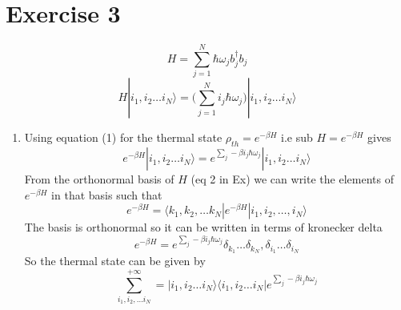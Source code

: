 \documentclass[12pt]{article}
\begin{document}
\section{Exercise 3}
$$ H = \sum_{j=1}^N \hbar \omega_j b_j^{\dagger} b_j $$
\begin{equation}
     H | i_1, i_2 \ldots i_N \rangle = \Big( \sum_{j=1}^N i_j \hbar \omega_j \Big) | i_1, i_2 \ldots i_N \rangle 
\end{equation}
\begin{enumerate}
    \item  Using equation (1) for the thermal state $\rho_{th} = e^{-\beta H}$  i.e sub $H = e^{- \beta H} $ gives 
    $$ e^{-\beta H} | i_1, i_2 \ldots i_N \rangle = e^{ \sum_j - \beta i_j \hbar \omega_j  } | i_1, i_2 \ldots i_N \rangle $$
    From the orthonormal basis of $H$ (eq 2 in Ex) we can write the elements of $e^{- \beta H}$ in that basis such that 
    $$ e^{-\beta H} = \langle k_1, k_2, \ldots k_N | e^{-\beta H} | i_1, i_2, \ldots, i_N \rangle $$
    The basis is orthonormal so it can be written in terms of kronecker delta 
    $$ e^{- \beta H} = e^{\sum_j - \beta i_j \hbar \omega_j } \delta_{k_1} \ldots \delta_{k_N}, \delta_{i_1} \ldots \delta_{i_N} $$
    So the thermal state can be given by 
    $$ \sum_{i_1,i_2, \ldots i_N}^{+ \infty} = | i_1, i_2 \ldots i_N \rangle \langle i_1, i_2 \ldots i_N | e^{\sum_j - \beta i_j \hbar \omega_j} $$


\end{enumerate}
\end{document}
